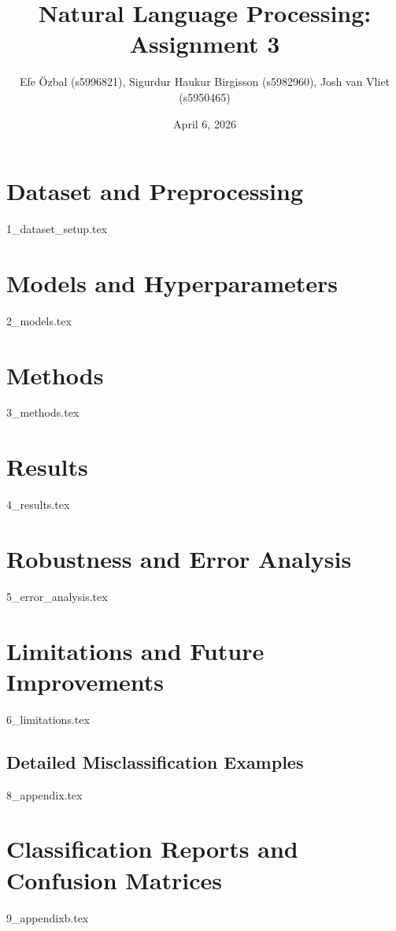 \documentclass{article}
\title{\textbf{Natural Language Processing: Assignment 3}}
\author{Efe Özbal (s5996821), Sigurdur Haukur Birgisson (s5982960), Josh van Vliet (s5950465)}
\date{April 6, 2026}
\begin{document}
\maketitle

\section{Dataset and Preprocessing}
\label{sec:dataset}
{1_dataset_setup.tex}


\section{Models and Hyperparameters}
{2_models.tex}

\section{Methods}
\label{sec:methods}
{3_methods.tex}

\section{Results}
\label{sec:results}
{4_results.tex}

\section{Robustness and Error Analysis}
{5_error_analysis.tex}

\section{Limitations and Future Improvements}
{6_limitations.tex}




\newpage

\appendix
\newpage
{}
\begin{landscape}
\section{Detailed Misclassification Examples}
\label{app:misclass}
{8_appendix.tex}

\clearpage

\end{landscape}
\restoregeometry

\section{Classification Reports and Confusion Matrices}
\label{app:reports}
{9_appendixb.tex}

\end{document}

